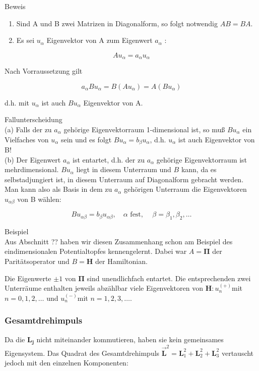 \documentclass[10pt, letterpaper]{article}
\begin{document}
Beweis

\begin{enumerate}
  \item Sind A und B zwei Matrizen in Diagonalform, so folgt notwendig $A B=B A$.
  \item Es sei $u_{\alpha}$ Eigenvektor von A zum Eigenwert $a_{\alpha}$ :
\end{enumerate}

$$
A u_{\alpha}=a_{\alpha} u_{\alpha}
$$

Nach Vorraussetzung gilt

$$
a_{\alpha} B u_{\alpha}=B\left(A u_{\alpha}\right)=A\left(B u_{\alpha}\right)
$$

d.h. mit $u_{\alpha}$ ist auch $B u_{\alpha}$ Eigenvektor von A.

Fallunterscheidung\\
(a) Falls der zu $a_{\alpha}$ gehörige Eigenvektorraum 1-dimensional ist, so muß $B u_{\alpha}$ ein Vielfaches von $u_{\alpha}$ sein und es folgt $B u_{\alpha}=b_{\beta} u_{\alpha}$, d.h. $u_{\alpha}$ ist auch Eigenvektor von B!\\
(b) Der Eigenwert $a_{\alpha}$ ist entartet, d.h. der zu $a_{\alpha}$ gehörige Eigenvektorraum ist mehrdimensional. $B u_{\alpha}$ liegt in diesem Unterraum und $B$ kann, da es selbstadjungiert ist, in diesem Unterraum auf Diagonalform gebracht werden. Man kann also als Basis in dem zu $a_{\alpha}$ gehörigen Unterraum die Eigenvektoren $u_{\alpha \beta}$ von B wählen:

$$
B u_{\alpha \beta}=b_{\beta} u_{\alpha \beta}, \quad \alpha \text { fest, } \quad \beta=\beta_{1}, \beta_{2}, \ldots
$$

Beispiel\\
Aus Abschnitt ?? haben wir diesen Zusammenhang schon am Beispiel des eindimensionalen Potentialtopfes kennengelernt. Dabei war $A=\boldsymbol{\Pi}$ der Paritätsoperator und $B=\mathbf{H}$ der Hamiltonian.

Die Eigenwerte $\pm 1$ von $\boldsymbol{\Pi}$ sind unendlichfach entartet. Die entsprechenden zwei Unterräume enthalten jeweils abzählbar viele Eigenvektoren von $\mathbf{H}: u_{n}^{(+)}$mit $n=0,1,2, \ldots$ und $u_{n}^{(-)}$mit $n=1,2,3, \ldots$.

\subsubsection*{Gesamtdrehimpuls}
Da die $\mathbf{L}_{\mathbf{j}}$ nicht miteinander kommutieren, haben sie kein gemeinsames Eigensystem. Das Quadrat des Gesamtdrehimpuls $\overrightarrow{\mathbf{L}}^{2}=\mathbf{L}_{1}^{2}+\mathbf{L}_{2}^{2}+\mathbf{L}_{3}^{2}$ vertauscht jedoch mit den einzelnen Komponenten:
\end{document}
